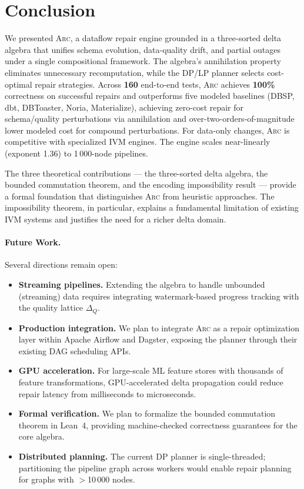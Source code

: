 \documentclass[sigplan,screen,nonacm]{acmart}
\newcommand{\arc}{\textsc{Arc}\xspace}
\newcommand{\DeltaQ}{\Delta_{\!Q}}
\begin{document}
\section{Conclusion}\label{sec:conclusion}

We presented \arc, a dataflow repair engine grounded in a three-sorted
delta algebra that unifies schema evolution, data-quality drift, and
partial outages under a single compositional framework.  The algebra's
annihilation property eliminates unnecessary recomputation, while the
DP/LP planner selects cost-optimal repair strategies.  Across \textbf{160}
end-to-end tests, \arc achieves \textbf{100\%} correctness on successful repairs
and outperforms five modeled baselines (DBSP, dbt, DBToaster, Noria, Materialize),
achieving zero-cost repair for schema/quality perturbations via annihilation and
over-two-orders-of-magnitude lower modeled cost for compound perturbations.  For data-only
changes, \arc is competitive with specialized IVM engines.  The engine
scales near-linearly (exponent 1.36) to 1\,000-node pipelines.

The three theoretical contributions --- the three-sorted delta algebra,
the bounded commutation theorem, and the encoding impossibility result
--- provide a formal foundation that distinguishes \arc from heuristic
approaches.  The impossibility theorem, in particular, explains a
fundamental limitation of existing IVM systems and justifies the need
for a richer delta domain.

\paragraph{Future Work.}
Several directions remain open:
\begin{itemize}
\item \textbf{Streaming pipelines.}  Extending the algebra to handle
  unbounded (streaming) data requires integrating watermark-based
  progress tracking with the quality lattice $\DeltaQ$.
\item \textbf{Production integration.}  We plan to integrate \arc as a
  repair optimization layer within Apache Airflow and Dagster, exposing
  the planner through their existing DAG scheduling APIs.
\item \textbf{GPU acceleration.}  For large-scale ML feature stores with
  thousands of feature transformations, GPU-accelerated delta propagation
  could reduce repair latency from milliseconds to microseconds.
\item \textbf{Formal verification.}  We plan to formalize the bounded
  commutation theorem in Lean~4, providing machine-checked correctness
  guarantees for the core algebra.
\item \textbf{Distributed planning.}  The current DP planner is
  single-threaded; partitioning the pipeline graph across workers would
  enable repair planning for graphs with $>$10\,000 nodes.
\end{itemize}
\end{document}

